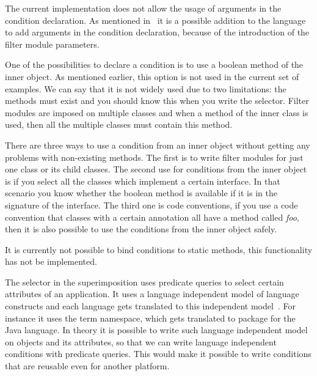 The current implementation does not allow the usage of arguments in the condition declaration.
As mentioned in~\cite{Doornenbal2006}
it is a possible addition to the language to add arguments in the condition declaration, because of the introduction of the filter module parameters.

One of the possibilities to declare a condition is to use a boolean method of the inner object. 
As mentioned earlier, this option is not used in the current set of examples. 
We can say that it is not widely used due to two limitations:
the methods must exist and you should know this when you write the selector. 
Filter modules are imposed on multiple classes and when a method of the inner class is used, then all the multiple classes must contain this method.

There are three ways to use a condition from an inner object without getting any problems with non-existing methods. 
The first is to write filter modules for just one class or its child classes. 
The second use for conditions from the inner object is if you select all the classes which implement a certain interface. 
In that scenario you know whether the boolean method is available if it is in the signature of the interface.
The third one is code conventions, if you use a code convention that classes with a certain annotation all have a method called \emph{foo}, then it is also possible to use the conditions from the inner object safely.

It is currently not possible to bind conditions to static methods, this functionality has not be implemented.

The selector in the superimposition uses predicate queries to select certain attributes of an application. 
It uses a language independent model of language constructs and each language gets translated to this independent model~\cite{Havinga2005}. 
For instance it uses the term namespace, which gets translated to package for the Java language. 
In theory it is possible to write such language independent model on objects and its attributes, so that we can write language independent conditions with predicate queries. 
This would make it possible to write conditions that are reusable even for another platform.